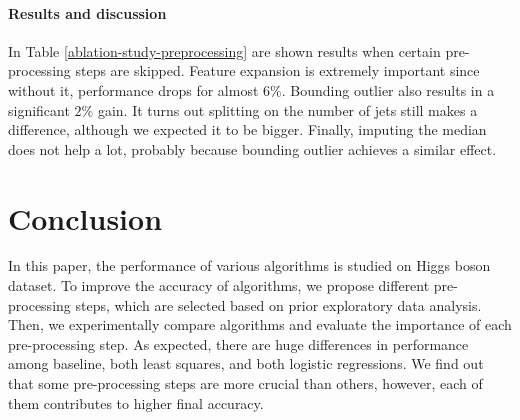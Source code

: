 \paragraph{Results and discussion}
In Table \ref{ablation-study-preprocessing} are shown results when certain pre-processing steps are skipped. Feature expansion is extremely important since without it, performance drops for almost $6\%$. Bounding outlier also results in a significant $2\%$ gain. It turns out splitting on the number of jets still makes a difference, although we expected it to be bigger. Finally, imputing the median does not help a lot, probably because bounding outlier achieves a similar effect.





\section{Conclusion}
\label{conclusion}

In this paper, the performance of various algorithms is studied on Higgs boson dataset. To improve the accuracy of algorithms, we propose different pre-processing steps, which are selected based on prior exploratory data analysis. Then, we experimentally compare algorithms and evaluate the importance of each pre-processing step. As expected, there are huge differences in performance among baseline, both least squares, and both logistic regressions. We find out that some pre-processing steps are more crucial than others, however, each of them contributes to higher final accuracy.

\pagebreak

